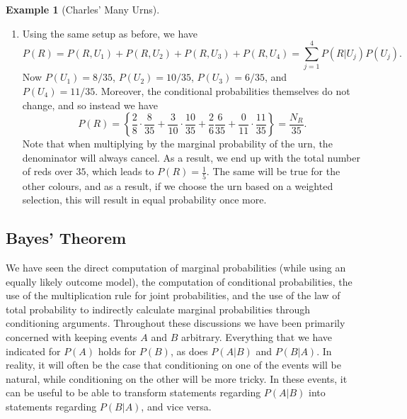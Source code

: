 \documentclass[
  letterpaper,
  DIV=11,
  numbers=noendperiod]{scrreprt}
\theoremstyle{definition}
\theoremstyle{definition}
\theoremstyle{definition}
\newtheorem{example}{Example}[chapter]
\theoremstyle{remark}
\begin{document}
\begin{example}[Charles' Many
Urns]
\begin{tcolorbox}[enhanced jigsaw, colback=white, breakable, rightrule=.15mm, leftrule=.75mm, toprule=.15mm, left=2mm, arc=.35mm, opacityback=0, bottomrule=.15mm]
\begin{enumerate}
  Note that these probabilities sum to \(1\). In decimal these simplify
  to approximately 0.221, 0.168, 0.2, 0.206, 0.206.
\item
  Using the same setup as before, we have
  \[P(R) = P(R, U_1) + P(R, U_2) + P(R, U_3) + P(R, U_4) = \sum_{j=1}^4 P(R|U_j)P(U_j).\]
  Now \(P(U_1) = 8/35\), \(P(U_2) = 10/35\), \(P(U_3) = 6/35\), and
  \(P(U_4) = 11/35\). Moreover, the conditional probabilities themselves
  do not change, and so instead we have
  \[P(R) = \left\{\frac{2}{8}\cdot\frac{8}{35} + \frac{3}{10}\cdot\frac{10}{35} + \frac{2}{6}\frac{6}{35} + \frac{0}{11}\cdot\frac{11}{35}\right\} = \frac{N_R}{35}.\]
  Note that when multiplying by the marginal probability of the urn, the
  denominator will always cancel. As a result, we end up with the total
  number of reds over \(35\), which leads to \(P(R) = \frac{1}{5}\). The
  same will be true for the other colours, and as a result, if we choose
  the urn based on a weighted selection, this will result in equal
  probability once more.
\end{enumerate}

\end{tcolorbox}

\end{example}

\subsection{Bayes' Theorem}\label{bayes-theorem}

We have seen the direct computation of marginal probabilities (while
using an equally likely outcome model), the computation of conditional
probabilities, the use of the multiplication rule for joint
probabilities, and the use of the law of total probability to indirectly
calculate marginal probabilities through conditioning arguments.
Throughout these discussions we have been primarily concerned with
keeping events \(A\) and \(B\) arbitrary. Everything that we have
indicated for \(P(A)\) holds for \(P(B)\), as does \(P(A|B)\) and
\(P(B|A)\). In reality, it will often be the case that conditioning on
one of the events will be natural, while conditioning on the other will
be more tricky. In these events, it can be useful to be able to
transform statements regarding \(P(A|B)\) into statements regarding
\(P(B|A)\), and vice versa.
\end{document}
